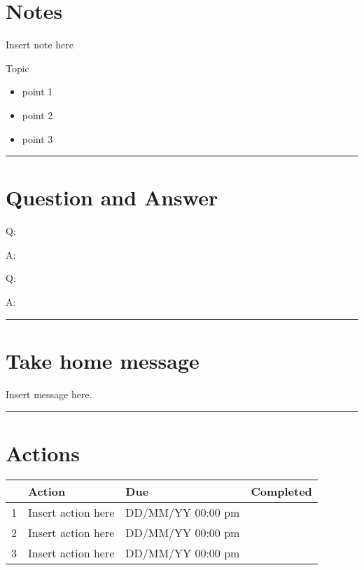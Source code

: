 \documentclass[
]{book}
\providecommand{\tightlist}{%
  \setlength{\itemsep}{0pt}\setlength{\parskip}{0pt}}
\begin{document}
\hypertarget{notes-5}{%
\section*{Notes}\label{notes-5}}

Insert note here

Topic

\begin{itemize}
\tightlist
\item
  point 1
\item
  point 2
\item
  point 3
\end{itemize}

\begin{center}\rule{0.5\linewidth}{0.5pt}\end{center}

\hypertarget{question-and-answer-5}{%
\section*{Question and Answer}\label{question-and-answer-5}}

Q:

A:

Q:

A:

\begin{center}\rule{0.5\linewidth}{0.5pt}\end{center}

\hypertarget{take-home-message-5}{%
\section*{Take home message}\label{take-home-message-5}}

Insert message here.

\begin{center}\rule{0.5\linewidth}{0.5pt}\end{center}

\hypertarget{actions-5}{%
\section*{Actions}\label{actions-5}}

\begin{longtable}[]{@{}llll@{}}
\toprule
& Action & Due & Completed \\
\midrule
\endhead
1 & Insert action here & DD/MM/YY 00:00 pm & \\
2 & Insert action here & DD/MM/YY 00:00 pm & \\
3 & Insert action here & DD/MM/YY 00:00 pm & \\
\bottomrule
\end{longtable}
\end{document}
